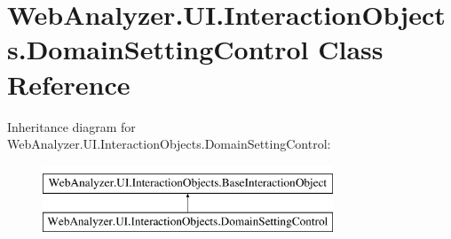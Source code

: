 \hypertarget{class_web_analyzer_1_1_u_i_1_1_interaction_objects_1_1_domain_setting_control}{}\section{Web\+Analyzer.\+U\+I.\+Interaction\+Objects.\+Domain\+Setting\+Control Class Reference}
\label{class_web_analyzer_1_1_u_i_1_1_interaction_objects_1_1_domain_setting_control}
Inheritance diagram for Web\+Analyzer.\+U\+I.\+Interaction\+Objects.\+Domain\+Setting\+Control\+:\begin{figure}[H]
\begin{center}
\leavevmode
\includegraphics[height=2.000000cm]{class_web_analyzer_1_1_u_i_1_1_interaction_objects_1_1_domain_setting_control}
\end{center}
\end{figure}
